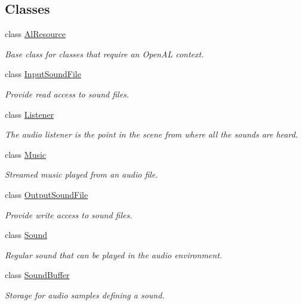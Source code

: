 \subsection*{Classes}
\begin{DoxyCompactItemize}
\item 
class \hyperlink{classsf_1_1_al_resource}{Al\-Resource}
\begin{DoxyCompactList}\small\item\em Base class for classes that require an Open\-A\-L context. \end{DoxyCompactList}\item 
class \hyperlink{classsf_1_1_input_sound_file}{Input\-Sound\-File}
\begin{DoxyCompactList}\small\item\em Provide read access to sound files. \end{DoxyCompactList}\item 
class \hyperlink{classsf_1_1_listener}{Listener}
\begin{DoxyCompactList}\small\item\em The audio listener is the point in the scene from where all the sounds are heard. \end{DoxyCompactList}\item 
class \hyperlink{classsf_1_1_music}{Music}
\begin{DoxyCompactList}\small\item\em Streamed music played from an audio file. \end{DoxyCompactList}\item 
class \hyperlink{classsf_1_1_output_sound_file}{Output\-Sound\-File}
\begin{DoxyCompactList}\small\item\em Provide write access to sound files. \end{DoxyCompactList}\item 
class \hyperlink{classsf_1_1_sound}{Sound}
\begin{DoxyCompactList}\small\item\em Regular sound that can be played in the audio environment. \end{DoxyCompactList}\item 
class \hyperlink{classsf_1_1_sound_buffer}{Sound\-Buffer}
\begin{DoxyCompactList}\small\item\em Storage for audio samples defining a sound. \end{DoxyCompactList}\item 

\end{DoxyCompactItemize}

